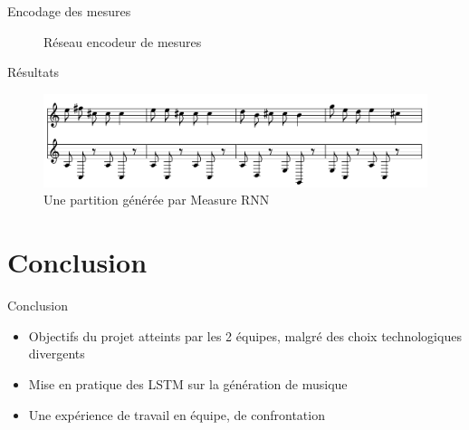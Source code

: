 \documentclass{beamer}
\begin{document}
\begin{frame}{Encodage des mesures}
\begin{figure}
\begin{center}

\caption{Réseau encodeur de mesures}
\end{center}
\end{figure}
\end{frame}

\begin{frame}{Résultats}
\begin{figure}
\begin{center}
\includegraphics[scale=0.3]{images/measure_rnn_result.png}
\caption{Une partition générée par Measure RNN}
\end{center}
\end{figure}
\end{frame}

\section{Conclusion}


\begin{frame}{Conclusion}
  \begin{itemize}
    \item Objectifs du projet atteints par les 2 équipes, malgré des choix technologiques divergents
    \item Mise en pratique des LSTM sur la génération de musique
    \item Une expérience de travail en équipe, de confrontation
  \end{itemize}
\end{frame}
\end{document}
